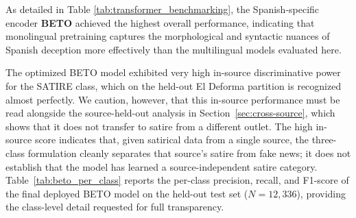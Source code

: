 \documentclass[informatics,article,submit,pdftex,moreauthors]{Definitions/mdpi}
\begin{document}
As detailed in Table \ref{tab:transformer_benchmarking}, the Spanish-specific encoder \textbf{BETO} achieved the highest overall performance, indicating that monolingual pretraining captures the morphological and syntactic nuances of Spanish deception more effectively than the multilingual models evaluated here.

\begin{table}[H]
\centering
\caption{Benchmarking of State-of-the-Art Transformer Models on the 3-Class Test Set.}
\label{tab:transformer_benchmarking}
\end{table}


The optimized BETO model exhibited very high in-source discriminative power for the SATIRE class, which on the held-out El Deforma partition is recognized almost perfectly. We caution, however, that this in-source performance must be read alongside the source-held-out analysis in Section~\ref{sec:cross-source}, which shows that it does not transfer to satire from a different outlet. The high in-source score indicates that, given satirical data from a single source, the three-class formulation cleanly separates that source's satire from fake news; it does not establish that the model has learned a source-independent satire category. Table~\ref{tab:beto_per_class} reports the per-class precision, recall, and F1-score of the final deployed BETO model on the held-out test set ($N=12{,}336$), providing the class-level detail requested for full transparency.
\end{document}
